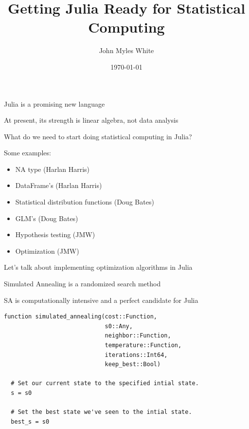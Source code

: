 \documentclass{beamer}
\title{Getting Julia Ready for Statistical Computing}
\author{John Myles White}
\date{\today}
\begin{document}
\frame{\titlepage}

\frame
{
	\begin{center}
		Julia is a promising new language
	\end{center}
}

\frame
{
	\begin{center}
		At present, its strength is linear algebra, not data analysis
	\end{center}
}

\frame
{
	\begin{center}
		What do we need to start doing statistical computing in Julia?
	\end{center}
}

\frame
{
	Some examples:
	\begin{itemize}
		\item<1->{NA type (Harlan Harris)}
		\item<2->{DataFrame's (Harlan Harris)}
		\item<3->{Statistical distribution functions (Doug Bates)}
		\item<4->{GLM's (Doug Bates)}
		\item<5->{Hypothesis testing (JMW)}
		\item<6->{Optimization (JMW)}
	\end{itemize}
}

\frame
{
	\begin{center}
		 Let's talk about implementing optimization algorithms in Julia
	\end{center}
}

\frame
{
	\begin{center}
		Simulated Annealing is a randomized search method
	\end{center}
}

\frame
{
	\begin{center}
		SA is computationally intensive and a perfect candidate for Julia
	\end{center}
}

\begin{frame}[fragile]
	\begin{verbatim}
function simulated_annealing(cost::Function,
                             s0::Any,
                             neighbor::Function,
                             temperature::Function,
                             iterations::Int64,
                             keep_best::Bool)
                             
  # Set our current state to the specified intial state.
  s = s0

  # Set the best state we've seen to the intial state.
  best_s = s0
	\end{verbatim}
\end{frame}
\end{document}

